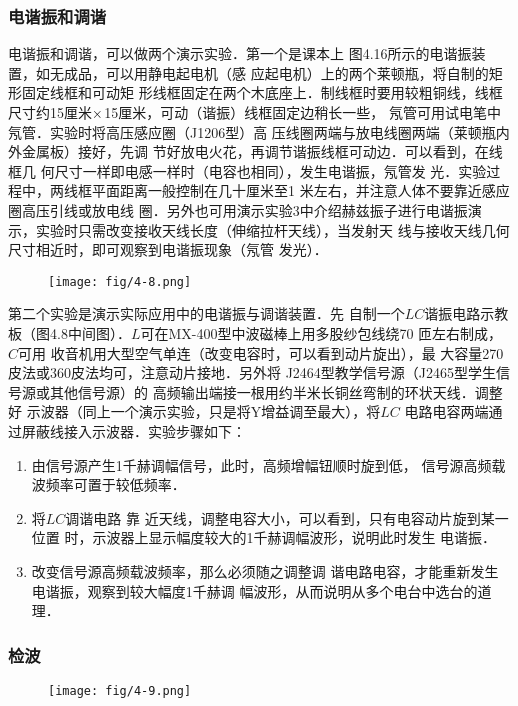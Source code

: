 \subsubsection{电谐振和调谐}
电谐振和调谐，可以做两个演示实验．第一个是课本上
图4.16所示的电谐振装置，如无成品，可以用静电起电机（感
应起电机）上的两个莱顿瓶，将自制的矩形固定线框和可动矩
形线框固定在两个木底座上．制线框时要用较粗铜线，线框
尺寸约15厘米$\times$15厘米，可动（谐振）线框固定边稍长一些，
氖管可用试电笔中氖管．实验时将高压感应圈（J1206型）高
压线圈两端与放电线圈两端（莱顿瓶内外金属板）接好，先调
节好放电火花，再调节谐振线框可动边．可以看到，在线框几
何尺寸一样即电感一样时（电容也相同），发生电谐振，氖管发
光．实验过程中，两线框平面距离一般控制在几十厘米至1
米左右，并注意人体不要靠近感应圈高压引线或放电线
圈．另外也可用演示实验3中介绍赫兹振子进行电谐振演
示，实验时只需改变接收天线长度（伸缩拉杆天线），当发射天
线与接收天线几何尺寸相近时，即可观察到电谐振现象（氖管
发光）．

\begin{figure}[htp]
    \centering
\texttt{[image: fig/4-8.png]}
    \caption{}
\end{figure}

第二个实验是演示实际应用中的电谐振与调谐装置．先
自制一个$LC$谐振电路示教板（图4.8中间图）．$L$可在MX-400型中波磁棒上用多股纱包线绕70 匝左右制成，$C$可用
收音机用大型空气单连（改变电容时，可以看到动片旋出），最
大容量270皮法或360皮法均可，注意动片接地．另外将
J2464型教学信号源（J2465型学生信号源或其他信号源）的
高频输出端接一根用约半米长铜丝弯制的环状天线．调整好
示波器（同上一个演示实验，只是将Y增益调至最大），将$LC$
电路电容两端通过屏蔽线接入示波器．实验步骤如下：
\begin{enumerate}
\item 由信号源产生1千赫调幅信号，此时，高频增幅钮顺时旋到低，
信号源高频载波频率可置于较低频率．
\item 将$LC$调谐电路 靠
近天线，调整电容大小，可以看到，只有电容动片旋到某一位置
时，示波器上显示幅度较大的1千赫调幅波形，说明此时发生
电谐振．
\item 改变信号源高频载波频率，那么必须随之调整调
谐电路电容，才能重新发生电谐振，观察到较大幅度1千赫调
幅波形，从而说明从多个电台中选台的道理．
\end{enumerate}

\subsubsection{检波}


\begin{figure}[htp]
    \centering
\texttt{[image: fig/4-9.png]}
    \caption{}
\end{figure}

